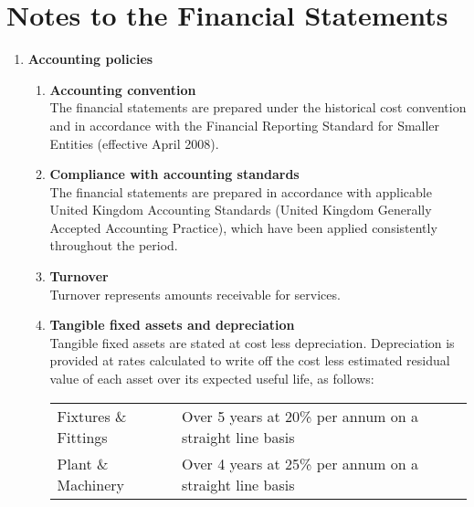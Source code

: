 \section {Notes to the Financial Statements}
\begin{enumerate}
    \item {\bf Accounting policies}
    \begin{enumerate}
        \item {\bf Accounting convention} \\
                The financial statements are prepared under the 
            historical cost convention and in accordance with the Financial Reporting 
            Standard for Smaller Entities (effective April 2008).
        \item {\bf Compliance with accounting standards} \\
            The financial statements are prepared in accordance with applicable United
            Kingdom Accounting Standards (United Kingdom Generally Accepted Accounting
            Practice), which have been applied consistently throughout the period.
        \item {\bf Turnover} \\
            Turnover represents amounts receivable for services.
        \item {\bf Tangible fixed assets and depreciation} \\
            Tangible fixed assets are stated at cost less depreciation. Depreciation is
            provided at rates calculated to write off the cost less estimated residual
            value of each asset over its expected useful life, as follows: \\[6pt]
            \begin{tabular}{  l  p{6.5cm} }
                \toprule
                Fixtures \& Fittings & Over 5 years at 20\% per annum on a straight line basis \\
                Plant \& Machinery & Over 4 years at 25\% per annum on a straight line basis \\
                \bottomrule
            \end{tabular}
    \end{enumerate}
\end{enumerate}
